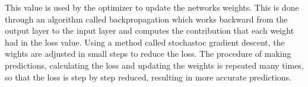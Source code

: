 This value is used by the optimizer to update the networks weights. This is done through an algorithm called backpropagation which works backward from the output layer to the input layer and computes the contribution that each weight had in the loss value. Using a method called stochastoc gradient descent, the wights are adjusted in small steps to reduce the loss. The procedure of making predictions, calculating the loss and updating the weights is repeated many times, so that the loss is step by step reduced, resulting in more accurate predictions.

